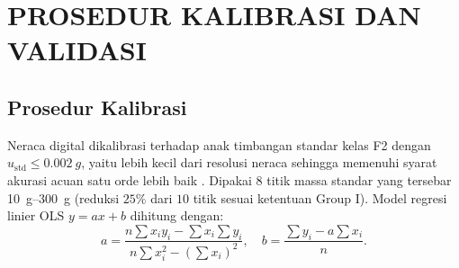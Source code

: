 \documentclass[a4paper, 12pt]{article}
\begin{document}
\section{PROSEDUR KALIBRASI DAN VALIDASI}
        \subsection{Prosedur Kalibrasi}
        Neraca digital dikalibrasi terhadap anak timbangan standar kelas F2 dengan $u_{\mathrm{std}}\le\SI{0,002}{g}$, yaitu lebih kecil dari resolusi neraca sehingga memenuhi syarat akurasi acuan satu orde lebih baik \parencite{Yhuwana2026}. Dipakai $8$ titik massa standar yang tersebar \SIrange{10}{300}{g} (reduksi $25\%$ dari $10$ titik sesuai ketentuan Group I). Model regresi linier OLS $y=ax+b$ dihitung dengan:
        \begin{equation}
            a=\frac{n\sum x_iy_i-\sum x_i\sum y_i}{n\sum x_i^{2}-\left(\sum x_i\right)^{2}},\quad
            b=\frac{\sum y_i-a\sum x_i}{n}.
            \label{eq:ols}
        \end{equation}
\end{document}
